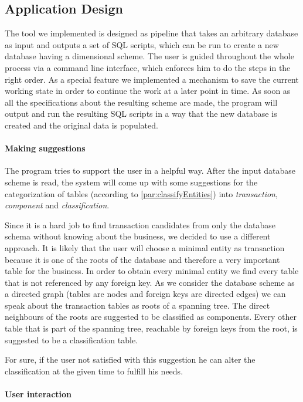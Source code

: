 \subsection{Application Design}

The tool we implemented is designed as pipeline that takes an arbitrary database as input and outputs a set of SQL scripts, which can be run to create a new database having a dimensional scheme.
The user is guided throughout the whole process via a command line interface, which enforces him to do the steps in the right order.
As a special feature we implemented a mechanism to save the current working state in order to continue the work at a later point in time.
As soon as all the specifications about the resulting scheme are made, the program will output and run the resulting SQL scripts in a way that the new database is created and the original data is populated.

\paragraph{Making suggestions}

The program tries to support the user in a helpful way.
After the input database scheme is read, the system will come up with some suggestions for the categorization of tables (according to \ref{par:classifyEntities}) into \emph{transaction}, \emph{component} and \emph{classification}.

Since it is a hard job to find transaction candidates from only the database schema without knowing about the business, we decided to use a different approach.
It is likely that the user will choose a minimal entity as transaction because it is one of the roots of the database and therefore a very important table for the business.
In order to obtain every minimal entity we find every table that is not referenced by any foreign key.
As we consider the database scheme as a directed graph (tables are nodes and foreign keys are directed edges) we can speak about the transaction tables as roots of a spanning tree.
The direct neighbours of the roots are suggested to be classified as components.
Every other table that is part of the spanning tree, \ie reachable by foreign keys from the root, is suggested to be a classification table.

For sure, if the user not satisfied with this suggestion he can alter the classification at the given time to fulfill his needs.

\paragraph{User interaction}

